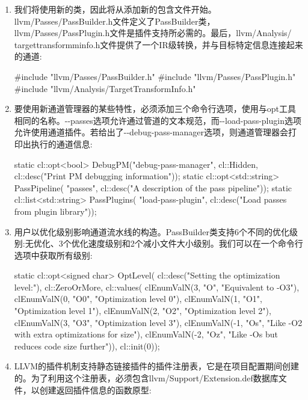 \begin{enumerate}
\item
我们将使用新的类，因此将从添加新的包含文件开始。llvm/Passes/PassBuilder.h文件定义了PassBuilder类，llvm/Passes/PassPlugin.h文件是插件支持所必需的。最后，llvm/Analysis/ targettransformminfo.h文件提供了一个IR级转换，并与目标特定信息连接起来的通道:

\begin{cpp}
#include "llvm/Passes/PassBuilder.h"
#include "llvm/Passes/PassPlugin.h"
#include "llvm/Analysis/TargetTransformInfo.h"
\end{cpp}

\item
要使用新通道管理器的某些特性，必须添加三个命令行选项，使用与opt工具相同的名称。-{}-passes选项允许通过管道的文本规范，而-{}-load-pass-plugin选项允许使用通道插件。若给出了-{}-debug-pass-manager选项，则通道管理器会打印出执行的通道信息:

\begin{cpp}
static cl::opt<bool>
    DebugPM("debug-pass-manager", cl::Hidden,
        cl::desc("Print PM debugging information"));
static cl::opt<std::string> PassPipeline(
    "passes",
    cl::desc("A description of the pass pipeline"));
static cl::list<std::string> PassPlugins(
    "load-pass-plugin",
    cl::desc("Load passes from plugin library"));
\end{cpp}

\item
用户以优化级别影响通道流水线的构造。PassBuilder类支持6个不同的优化级别:无优化、3个优化速度级别和2个减小文件大小级别。我们可以在一个命令行选项中获取所有级别:

\begin{cpp}
static cl::opt<signed char> OptLevel(
    cl::desc("Setting the optimization level:"),
    cl::ZeroOrMore,
    cl::values(
        clEnumValN(3, "O", "Equivalent to -O3"),
        clEnumValN(0, "O0", "Optimization level 0"),
        clEnumValN(1, "O1", "Optimization level 1"),
        clEnumValN(2, "O2", "Optimization level 2"),
        clEnumValN(3, "O3", "Optimization level 3"),
        clEnumValN(-1, "Os", "Like -O2 with extra optimizations for size"),
        clEnumValN(-2, "Oz", "Like -Os but reduces code size further")),
        cl::init(0));
\end{cpp}

\item
LLVM的插件机制支持静态链接插件的插件注册表，它是在项目配置期间创建的。为了利用这个注册表，必须包含llvm/Support/Extension.def数据库文件，以创建返回插件信息的函数原型:


\end{enumerate}
